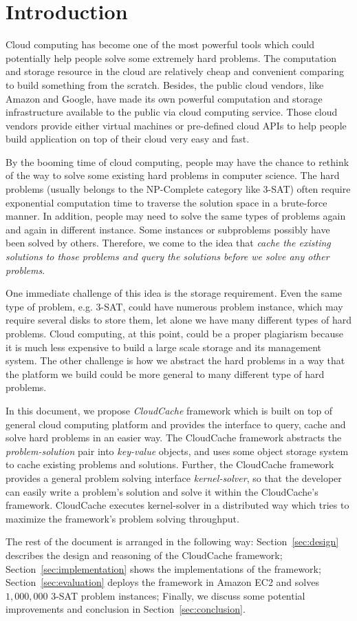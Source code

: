 \section{Introduction}\label{sec:introduction}
Cloud computing has become one of the most powerful tools which could potentially help people solve some extremely hard problems. The computation and storage resource in the cloud are relatively cheap and convenient comparing to build something from the scratch. Besides, the public cloud vendors, like Amazon and Google, have made its own powerful computation and storage infrastructure available to the public via cloud computing service. Those cloud vendors provide either virtual machines or pre-defined cloud APIs to help people build application on top of their cloud very easy and fast.

By the booming time of cloud computing, people may have the chance to rethink of the way to solve some existing hard problems in computer science. The hard problems (usually belongs to the NP-Complete category like 3-SAT) often require exponential computation time to traverse the solution space in a brute-force manner. In addition, people may need to solve the same types of problems again and again in different instance. Some instances or subproblems possibly have been solved by others. Therefore, we come to the idea that \emph{cache the existing solutions to those problems and query the solutions before we solve any other problems}. 

One immediate challenge of this idea is the storage requirement. Even the same type of problem, e.g. 3-SAT, could have numerous problem instance, which may require several disks to store them, let alone we have many different types of hard problems. Cloud computing, at this point, could be a proper plagiarism because it is much less expensive to build a large scale storage and its management system. The other challenge is how we abstract the hard problems in a way that the platform we build could be more general to many different type of hard problems.

In this document, we propose \emph{CloudCache} framework which is built on top of general cloud computing platform and provides the interface to query, cache and solve hard problems in an easier way. The CloudCache framework abstracts the \emph{problem-solution} pair into \emph{key-value} objects, and uses some object storage system to cache existing problems and solutions. Further, the CloudCache framework provides a general problem solving interface \emph{kernel-solver}, so that the developer can easily write a problem's solution and solve it within the CloudCache's framework. CloudCache executes kernel-solver in a distributed way which tries to maximize the framework's problem solving throughput.

The rest of the document is arranged in the following way: Section~\ref{sec:design} describes the design and reasoning of the CloudCache framework; Section~\ref{sec:implementation} shows the implementations of the framework; Section~\ref{sec:evaluation} deploys the framework in Amazon EC2 and solves $1,000,000$ 3-SAT problem instances; Finally, we discuss some potential improvements and conclusion in Section~\ref{sec:conclusion}.

